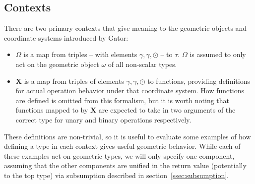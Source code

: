\documentclass{article}
\newcommand{\Chi}{\mathbf{X}}
\begin{document}
\subsection{Contexts}
There are two primary contexts that give meaning to the geometric objects and coordinate systems introduced by Gator:
\begin{itemize}
	\item $\Omega$ is a map from triples -- with elements $\gamma,\gamma,\odot$ -- to $\tau$.  $\Omega$ is assumed to only act on the geometric object $\omega$ of all non-scalar types.
	
	\item $\Chi$ is a map from triples of elements $\gamma, \gamma,\odot$ to functions, providing definitions for actual operation behavior under that coordinate system.
	How functions are defined is omitted from this formalism, but it is worth noting that functions mapped to by $\Chi$ are expected to take in two arguments of the correct type for unary and binary operations respectively.
\end{itemize}
These definitions are non-trivial, so it is useful to evaluate some examples of how defining a type in each context gives useful geometric behavior.  While each of these examples act on geometric types, we will only specify one component, assuming that the other components are unified in the return value (potentially to the top type) via subsumption described in section~\ref{ssec:subsumption}.
\end{document}

